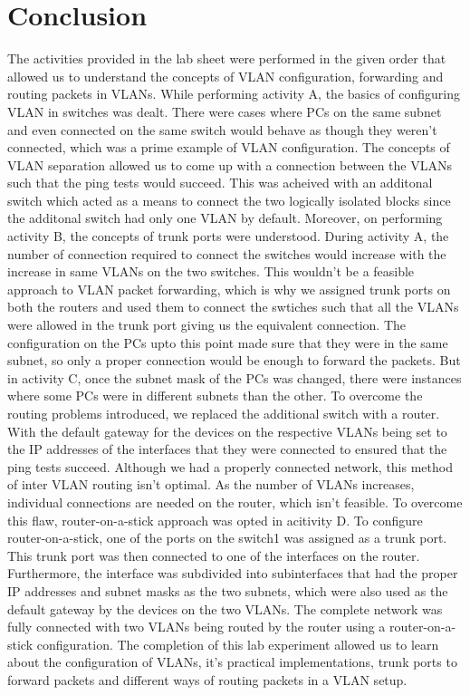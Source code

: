 \documentclass{lab_sheet}
\begin{document}
\section{Conclusion}
The activities provided in the lab sheet were performed in the given order that allowed us to understand the concepts of VLAN configuration, forwarding and routing packets in VLANs. While performing activity A, the basics of configuring VLAN in switches was dealt. There were cases where PCs on the same subnet and even connected on the same switch would behave as though they weren't connected, which was a prime example of VLAN configuration. The concepts of VLAN separation allowed us to come up with a connection between the VLANs such that the ping tests would succeed. This was acheived with an additonal switch which acted as a means to connect the two logically isolated blocks since the additonal switch had only one VLAN by default. Moreover, on performing activity B, the concepts of trunk ports were understood. During activity A, the number of connection required to connect the switches would increase with the increase in same VLANs on the two switches. This wouldn't be a feasible approach to VLAN packet forwarding, which is why we assigned trunk ports on both the routers and used them to connect the swtiches such that all the VLANs were allowed in the trunk port giving us the equivalent connection. The configuration on the PCs upto this point made sure that they were in the same subnet, so only a proper connection would be enough to forward the packets. But in activity C, once the subnet mask of the PCs was changed, there were instances where some PCs were in different subnets than the other. To overcome the routing problems introduced, we replaced the additional switch with a router. With the default gateway for the devices on the respective VLANs being set to the IP addresses of the interfaces that they were connected to ensured that the ping tests succeed. Although we had a properly connected network, this method of inter VLAN routing isn't optimal. As the number of VLANs increases, individual connections are needed on the router, which isn't feasible. To overcome this flaw, router-on-a-stick approach was opted in acitivity D. To configure router-on-a-stick, one of the ports on the switch1 was assigned as a trunk port. This trunk port was then connected to one of the interfaces on the router. Furthermore, the interface was subdivided into subinterfaces that had the proper IP addresses and subnet masks as the two subnets, which were also used as the default gateway by the devices on the two VLANs. The complete network was fully connected with two VLANs being routed by the router using a router-on-a-stick configuration. The completion of this lab experiment allowed us to learn about the configuration of VLANs, it's practical implementations, trunk ports to forward packets and different ways of routing packets in a VLAN setup.
\end{document}
